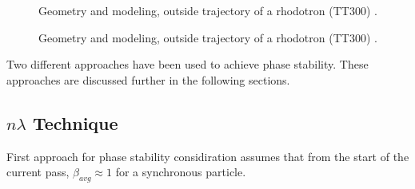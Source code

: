 \documentclass[a4paper,oneside,12pt]{report}
\numberwithin{equation}{chapter}
\begin{document}
\begin{figure}[H]
\begin{subfigure}{.5\textwidth}
    \end{subfigure}
    \caption{Geometry and modeling, outside trajectory of a rhodotron (TT300) \cite{rhodo_design}.}
    \label{fig:magnet_design_illustrations}
\end{figure} \fi
\vspace{20pt}
\begin{figure}[H]
    \centering
    \qquad{}%
    \vspace{0pt}
    \caption{\centering Geometry and modeling, outside trajectory of a rhodotron (TT300) \cite{rhodo_design}.} 
    \label{fig:magnet_design_illustrations}
    \vspace{-15pt}
\end{figure}

Two different approaches have been used to achieve phase stability.
These approaches are discussed further in the following sections.

\subsection{$n\lambda$ Technique} \label{sec:n_L_technique}

First approach for phase stability considiration assumes that from the start of the current pass, $\beta_{avg} \approx 1$ for a synchronous particle. 
\end{document}
